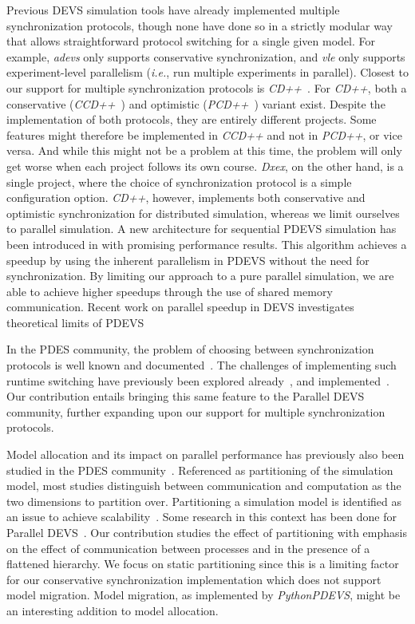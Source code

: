 Previous \textsf{DEVS} simulation tools have already implemented multiple synchronization protocols, though none have done so in a strictly modular way that allows straightforward protocol switching for a single given model.
For example, \textit{adevs} only supports conservative synchronization, and \textit{vle} only supports experiment-level parallelism (\textit{i.e.}, run multiple experiments in parallel).
Closest to our support for multiple synchronization protocols is \textit{CD++}~\cite{CD++}.
For \textit{CD++}, both a conservative (\textit{CCD++}~\cite{CCD++}) and optimistic (\textit{PCD++}~\cite{PCD++}) variant exist.
Despite the implementation of both protocols, they are entirely different projects.
Some features might therefore be implemented in \textit{CCD++} and not in \textit{PCD++}, or vice versa.
And while this might not be a problem at this time, the problem will only get worse when each project follows its own course.
\textit{Dxex}, on the other hand, is a single project, where the choice of synchronization protocol is a simple configuration option.
\textit{CD++}, however, implements both conservative and optimistic synchronization for distributed simulation, whereas we limit ourselves to parallel simulation. 
A new architecture for sequential PDEVS simulation has been introduced in \cite{SeqPDEVSArch} with promising performance results. This algorithm achieves a speedup by using the inherent parallelism in PDEVS without the need for synchronization.
By limiting our approach to a pure parallel simulation, we are able to achieve higher speedups through the use of shared memory communication. 
Recent work on parallel speedup in DEVS investigates theoretical limits of PDEVS~\cite{activitypdevs, amdahlpdevs}

In the \textsf{PDES} community, the problem of choosing between synchronization protocols is well known and documented~\cite{Jha:1994:UFC:195291.182480}.
The challenges of implementing such runtime switching have previously been explored already~\cite{Das:1996:APP:256562.256602}, and implemented~\cite{perumalla2005musik}.
Our contribution entails bringing this same feature to the \textsf{Parallel DEVS} community, further expanding upon our support for multiple synchronization protocols.

Model allocation and its impact on parallel performance has previously also been studied in the \textsf{PDES} community~\cite{PDESpartitioning}.
Referenced as partitioning of the simulation model, most studies distinguish between communication and computation as the two dimensions to partition over.
Partitioning a simulation model is identified as an issue to achieve scalability~\cite{Scalability}. 
Some research in this context has been done for \textsf{Parallel DEVS}~\cite{PDEVSpartitioning, NonFragmenting}.
Our contribution studies the effect of partitioning with emphasis on the effect of communication between processes and in the presence of a flattened hierarchy. 
We focus on static partitioning since this is a limiting factor for our conservative synchronization implementation which does not support model migration.
Model migration, as implemented by \textit{PythonPDEVS}, might be an interesting addition to model allocation.

